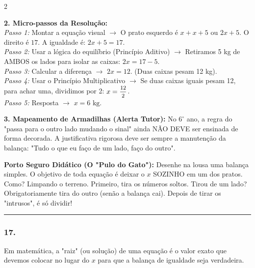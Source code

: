 \begin{multicols*}{2}
\begin{tcolorbox}[colback=CorTitUm!5, colframe=CorTitUm, boxrule=1pt, arc=4pt, left=6pt, right=6pt, top=6pt, bottom=6pt]
    \textbf{2. Micro-passos da Resolução:}\\
    \textit{Passo 1:} Montar a equação visual $\rightarrow$ O prato esquerdo é $x + x + 5$ ou $2x + 5$. O direito é $17$. A igualdade é: $ 2x + 5 = 17 $.\\
    \textit{Passo 2:} Usar a lógica do equilíbrio (Princípio Aditivo) $\rightarrow$ Retiramos 5 kg de AMBOS os lados para isolar as caixas: $ 2x = 17 - 5 $.\\
    \textit{Passo 3:} Calcular a diferença $\rightarrow$ $ 2x = 12 $. (Duas caixas pesam 12 kg).\\
    \textit{Passo 4:} Usar o Princípio Multiplicativo $\rightarrow$ Se duas caixas iguais pesam 12, para achar uma, dividimos por 2: $ x = \mfrac{12}{2} $.\\
    \textit{Passo 5:} Resposta $\rightarrow$ $ x = 6 \text{ kg} $.\par\vspace{0.1cm}
    
    \textbf{3. Mapeamento de Armadilhas (Alerta Tutor):} No $6^\circ$ ano, a regra do "passa para o outro lado mudando o sinal" ainda NÃO DEVE ser ensinada de forma decorada. A justificativa rigorosa deve ser sempre a manutenção da balança: "Tudo o que eu faço de um lado, faço do outro".
    \end{tcolorbox}
    \vspace{0.15cm}
    
    \begin{boxexplicacao}
    \textbf{Porto Seguro Didático (O "Pulo do Gato"):} Desenhe na lousa uma balança simples. O objetivo de toda equação é deixar o $x$ SOZINHO em um dos pratos. Como? Limpando o terreno. Primeiro, tira os números soltos. Tirou de um lado? Obrigatoriamente tira do outro (senão a balança cai). Depois de tirar os "intrusos", é só dividir!
    \end{boxexplicacao}
\fi

\par\vspace{\espacoQuestao}

\noindent\textcolor{CorLinha}{\rule{\linewidth}{0.5pt}} 
\par\vspace{\espacoPreQuestao}
\subsubsection*{17.} 
\begin{enunciadoLiteral}
Em matemática, a "raiz" (ou solução) de uma equação é o valor exato que devemos colocar no lugar do $x$ para que a balança de igualdade seja verdadeira. 


\end{enunciadoLiteral}
\end{multicols*}
